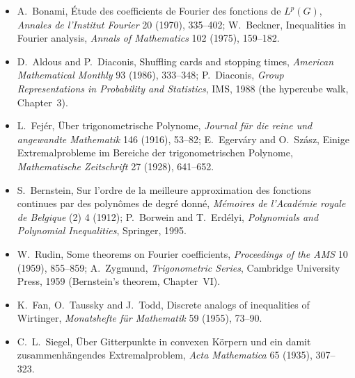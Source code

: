 \begin{itemize}
\emph{Philosophical Transactions of the Royal Society A} 192 (1899), 101--167; E.~Mossel, R.~O'Donnell and K.~Oleszkiewicz, Noise
stability of functions with low influences: invariance and optimality, \emph{Annals of Mathematics} 171 (2010), 295--341.
\item A.~Bonami, Étude des coefficients de Fourier des fonctions de $L^p(G)$, \emph{Annales de l'Institut Fourier} 20 (1970), 335--402;
W.~Beckner, Inequalities in Fourier analysis, \emph{Annals of Mathematics} 102 (1975), 159--182.
\item D.~Aldous and P.~Diaconis, Shuffling cards and stopping times, \emph{American Mathematical Monthly} 93 (1986), 333--348;
P.~Diaconis, \emph{Group Representations in Probability and Statistics}, IMS, 1988 (the hypercube walk, Chapter~3).
\item L.~Fejér, Über trigonometrische Polynome, \emph{Journal für die reine und angewandte Mathematik} 146 (1916), 53--82; E.~Egerváry
and O.~Szász, Einige Extremalprobleme im Bereiche der trigonometrischen Polynome, \emph{Mathematische Zeitschrift} 27 (1928), 641--652.
\item S.~Bernstein, Sur l'ordre de la meilleure approximation des fonctions continues par des polynômes de degré donné, \emph{Mémoires
de l'Académie royale de Belgique} (2) 4 (1912); P.~Borwein and T.~Erdélyi, \emph{Polynomials and Polynomial Inequalities}, Springer, 1995.
\item W.~Rudin, Some theorems on Fourier coefficients, \emph{Proceedings of the AMS} 10 (1959), 855--859; A.~Zygmund,
\emph{Trigonometric Series}, Cambridge University Press, 1959 (Bernstein's theorem, Chapter~VI).
\item K.~Fan, O.~Taussky and J.~Todd, Discrete analogs of inequalities of Wirtinger, \emph{Monatshefte für Mathematik} 59 (1955), 73--90.
\item C.~L.~Siegel, Über Gitterpunkte in convexen Körpern und ein damit zusammenhängendes Extremalproblem, \emph{Acta Mathematica} 65
(1935), 307--323.
\end{itemize}
